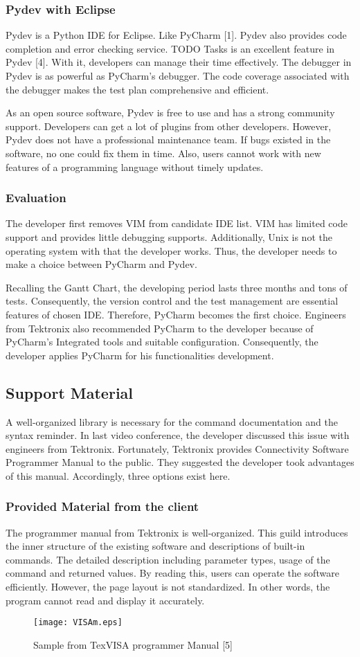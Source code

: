 \documentclass [10pt]{article}
\begin{document}
\subsubsection{Pydev with Eclipse}
Pydev is a Python IDE for Eclipse. Like PyCharm [1]. Pydev also provides code completion and error checking service. TODO Tasks is an excellent feature in Pydev [4]. With it, developers can manage their time effectively. The debugger in Pydev is as powerful as PyCharm’s debugger. The code coverage associated with the debugger makes the test plan comprehensive and efficient.  \par
As an open source software, Pydev is free to use and has a strong community support. Developers can get a lot of plugins from other developers. However, Pydev does not have a professional maintenance team.  If bugs existed in the software, no one could fix them in time. Also, users cannot work with new features of a programming language without timely updates.  
\subsubsection{Evaluation}
The developer first removes VIM from candidate IDE list. VIM has limited code support and provides little debugging supports. Additionally, Unix is not the operating system with that the developer works. Thus, the developer needs to make a choice between PyCharm and Pydev.  \par
Recalling the Gantt Chart, the developing period lasts three months and tons of tests. Consequently, the version control and the test management are essential features of chosen IDE. Therefore, PyCharm becomes the first choice. Engineers from Tektronix also recommended PyCharm to the developer because of PyCharm's Integrated tools and suitable configuration. Consequently, the developer applies PyCharm for his functionalities development.


\subsection{Support Material}
A well-organized library is necessary for the command documentation and the syntax reminder. In last video conference, the developer discussed this issue with engineers from Tektronix. Fortunately, Tektronix provides Connectivity Software Programmer Manual to the public. They suggested the developer took advantages of this manual. Accordingly, three options exist here. 
\subsubsection{Provided Material from the client}
The programmer manual from Tektronix is well-organized. This guild introduces the inner structure of the existing software and descriptions of built-in commands.  The detailed description including parameter types, usage of the command and returned values. By reading this, users can operate the software efficiently.  However,  the page layout is not standardized. In other words, the program cannot read and display it accurately.  
\begin{figure}[h]
\centering
\texttt{[image: VISAm.eps]}
\caption{Sample from TexVISA programmer Manual [5]}
\end{figure}
\end{document}
